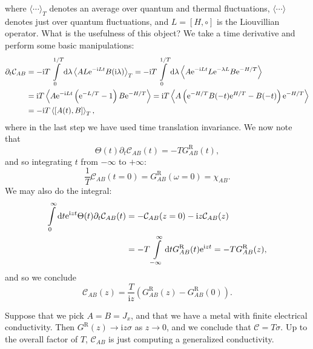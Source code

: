 \documentclass[10pt, oneside]{book}
\begin{document}
\begin{doublespace}
where $\langle \cdots \rangle_T$ denotes an average over quantum and thermal fluctuations, $\langle \cdots\rangle$ denotes just over quantum fluctuations, and $L=[H,\circ]$ is the Liouvillian operator.   What is the usefulness of this object?   We take a time derivative and perform some basic manipulations: \begin{align}
\partial_t \mathcal{C}_{AB} &= -\mathrm{i}T\int\limits_0^{1/T}\mathrm{d}\lambda \left\langle AL\mathrm{e}^{-\mathrm{i}Lt} B(\mathrm{i}\lambda)\right\rangle_T = -\mathrm{i}T\int\limits_0^{1/T}\mathrm{d}\lambda \left\langle A\mathrm{e}^{-\mathrm{i}Lt} L \mathrm{e}^{-\lambda L} B \mathrm{e}^{- H/T}\right\rangle \notag \\
&= \mathrm{i}T \left\langle A \mathrm{e}^{-\mathrm{i}Lt} \left(\mathrm{e}^{-L/T}-1\right) B \mathrm{e}^{-H/T}\right\rangle = \mathrm{i}T \left\langle A \left(\mathrm{e}^{-H/T}B(-t) \mathrm{e}^{H/T} - B(-t)\right)\mathrm{e}^{-H/T}\right\rangle \notag \\
&= -\mathrm{i}T\left\langle [A(t),B] \right\rangle_T,
\end{align}
where in the last step we have used time translation invariance.   We now note that \begin{equation}
\Theta(t)\partial_t \mathcal{C}_{AB}(t) = -T G^{\mathrm{R}}_{AB}(t),
\end{equation}
and so integrating $t$ from $-\infty$ to $+\infty$: \begin{equation}
\frac{1}{T}\mathcal{C}_{AB}(t=0) = G^{\mathrm{R}}_{AB}(\omega=0) = \chi_{AB}.
\end{equation}
We may also do the integral: \begin{align}
\int\limits_0^\infty \mathrm{d}t \mathrm{e}^{\mathrm{i}zt} \Theta(t)\partial_t \mathcal{C}_{AB}(t) &= -\mathcal{C}_{AB}(z=0) - \mathrm{i}z\mathcal{C}_{AB}(z) \notag \\
&= -T\int\limits_{-\infty}^\infty \mathrm{d}t G^{\mathrm{R}}_{AB}(t) \mathrm{e}^{\mathrm{i}zt} = -TG^{\mathrm{R}}_{AB}(z),
\end{align}
and so we conclude \begin{equation}
\mathcal{C}_{AB}(z) = \frac{T}{\mathrm{i}z}\left(G^{\mathrm{R}}_{AB}(z) - G^{\mathrm{R}}_{AB}(0)\right).
\end{equation}

Suppose that we pick $A=B=J_x$, and that we have a metal with finite electrical conductivity.   Then $G^{\mathrm{R}}(z) \rightarrow \mathrm{i}z\sigma$ as $z\rightarrow 0$,  and we conclude that $\mathcal{C} = T\sigma$.   Up to the overall factor of $T$,  $\mathcal{C}_{AB}$ is just computing a generalized conductivity.


\end{doublespace}
\end{document}
